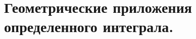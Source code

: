 \documentclass[../main.tex]{subfiles}
\begin{document}
\chapter{Геометрические приложения определенного интеграла.}



\end{document}
